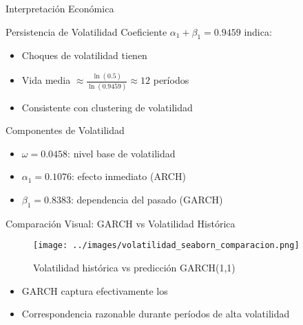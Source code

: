 \begin{frame}{Interpretación Económica}
    \begin{block}{Persistencia de Volatilidad}
        Coeficiente $\alpha_1 + \beta_1 = 0.9459$ indica:
        \begin{itemize}
            \item Choques de volatilidad tienen 
            \item Vida media $\approx \frac{\ln(0.5)}{\ln(0.9459)} \approx 12$ períodos
            \item Consistente con clustering de volatilidad
        \end{itemize}
    \end{block}
    
    \vspace{0.5em}
    
    \begin{block}{Componentes de Volatilidad}
        \begin{itemize}
            \item<2-> $\omega = 0.0458$: nivel base de volatilidad
            \item<3-> $\alpha_1 = 0.1076$: efecto inmediato (ARCH)
            \item<4-> $\beta_1 = 0.8383$: dependencia del pasado (GARCH)
        \end{itemize}
    \end{block}
\end{frame}

\begin{frame}{Comparación Visual: GARCH vs Volatilidad Histórica}
    \begin{figure}
        \centering
        \texttt{[image: ../images/volatilidad\_seaborn\_comparacion.png]}
        \caption{Volatilidad histórica vs predicción GARCH(1,1)}
    \end{figure}
        
    \begin{itemize}
        \item<2-> GARCH captura efectivamente los 
        \item<3-> Correspondencia razonable durante períodos de alta volatilidad
    \end{itemize}
\end{frame}

